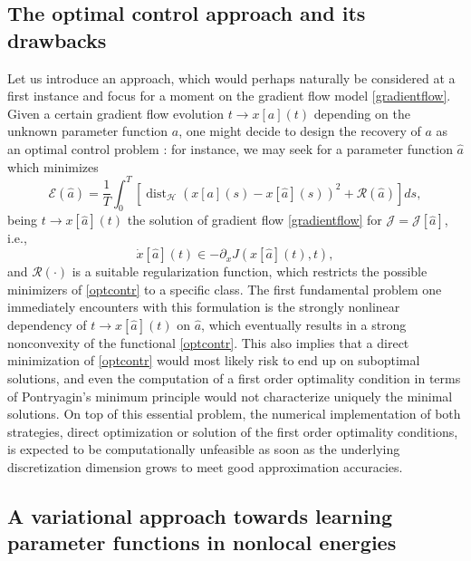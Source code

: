 \subsection{The optimal control approach and its drawbacks}
Let us introduce an approach, which would perhaps naturally be considered at a first instance and focus for a moment on the gradient flow model \eqref{gradientflow}. Given a certain gradient flow evolution $t \to x[a](t)$ depending on the unknown parameter function $a$, one might decide to design the recovery of $a$ as an optimal control problem \cite{brpi07}: for instance, we may seek for a parameter function $\widehat a$ which minimizes
\begin{equation}\label{optcontr}
\mathcal E(\widehat a) = \frac{1}{T}\int_0^T \left [ \operatorname{dist}_{\mathcal H}(x[a](s) - x[\widehat a](s))^2 + \mathcal R(\widehat a) \right ] d s ,
\end{equation}
being $t \to x[\widehat a](t)$ the solution of gradient flow \eqref{gradientflow} for $\mathcal J = \mathcal J[\widehat a]$, i.e.,
\begin{equation}\label{gradientflow2}
\dot x[\widehat a](t) \in - \partial_x J(x[\widehat a](t),t),
\end{equation}
and $\mathcal R(\cdot)$ is a suitable regularization function, which restricts the possible minimizers of \eqref{optcontr} to a specific class. The first fundamental problem one immediately encounters with this formulation is the strongly nonlinear dependency of $t \to x[\widehat a](t)$ on $\widehat a$, which eventually results in a strong nonconvexity of the functional \eqref{optcontr}. This also implies that a direct minimization of \eqref{optcontr} would most likely risk to end up on suboptimal solutions, and even the computation of a first order optimality condition in terms of Pontryagin's minimum principle would not characterize uniquely the minimal solutions. On top of this essential problem, the numerical implementation of both strategies, direct optimization or solution of the first order optimality conditions, is expected to be computationally unfeasible as soon as the underlying discretization dimension grows to meet good approximation accuracies.

\subsection{A variational approach towards learning parameter functions in nonlocal energies}\label{sec:wp2}

